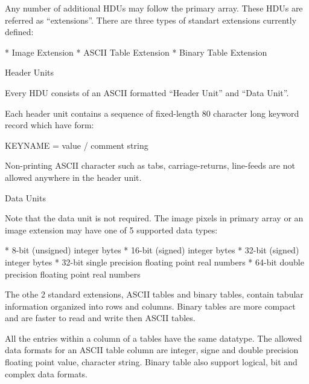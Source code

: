 Any number of additional HDUs may follow the primary array.
These HDUs are referred as ``extensions''. There are three
types of standart extensions currently defined:

\begitems
* Image Extension
* ASCII Table Extension
* Binary Table Extension
\enditems

\secc Header Units

Every HDU consists of an ASCII formatted ``Header Unit'' and
``Data Unit''.

Each header unit contains a sequence of fixed-length 80
character long keyword record which have form:

\begtt
KEYNAME = value / comment string
\endtt

Non-printing ASCII character such as tabs,
carriage-returns, line-feeds are not allowed anywhere in
the header unit.

\secc Data Units

Note that the data unit is not required. The image pixels
in primary array or an image extension may have one of
5 supported data types:

\begitems
* 8-bit (unsigned) integer bytes
* 16-bit (signed) integer bytes
* 32-bit (signed) integer bytes
* 32-bit single precision floating point real numbers
* 64-bit double precision floating point real numbers
\enditems

The othe 2 standard extensions, ASCII tables and binary
tables, contain tabular information organized into rows
and columns. Binary tables are more compact and are faster
to read and write then ASCII tables.

All the entries within a column of a tables have the same
datatype. The allowed data formats for an ASCII table
column are integer, signe and double precision floating
point value, character string. Binary table also support
logical, bit and complex data formats.
